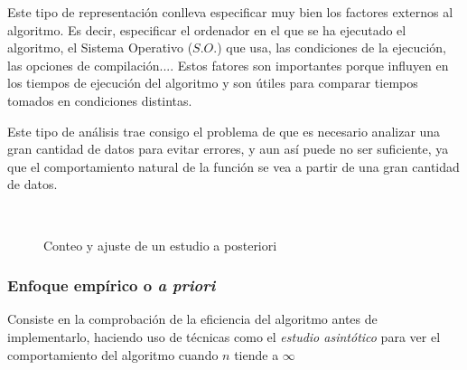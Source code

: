 \documentclass[10pt,a4paper,spanish]{report}
\theoremstyle{definition}
\theoremstyle{remark}
\begin{document}
    Este tipo de representación conlleva especificar muy bien los factores externos al algoritmo. Es decir, especificar el ordenador en el que se ha ejecutado el algoritmo, el Sistema Operativo ($S.O.$) que usa, las condiciones de la ejecución, las opciones de compilación.... Estos fatores son importantes porque influyen en los tiempos de ejecución del algoritmo y son útiles para comparar tiempos tomados en condiciones distintas.

    Este tipo de análisis trae consigo el problema de que es necesario analizar una gran cantidad de datos para evitar errores, y aun así puede no ser suficiente, ya que el comportamiento natural de la función se vea a partir de una gran cantidad de datos.

    \begin{figure}[!h]
    \centering
    \mbox {
    \qquad
    }
    \caption{Conteo y ajuste de un estudio a posteriori}
    \label{a-post}
    \end{figure}

    \subsubsection{\textcolor{YellowOrange}Enfoque empírico o \textit{a priori}}

    Consiste en la comprobación de la eficiencia del algoritmo antes de implementarlo, haciendo uso de técnicas como el \textit{\textcolor{YellowOrange}{estudio asintótico}} para ver el comportamiento del algoritmo cuando $n$ tiende a $\infty$
\end{document}

